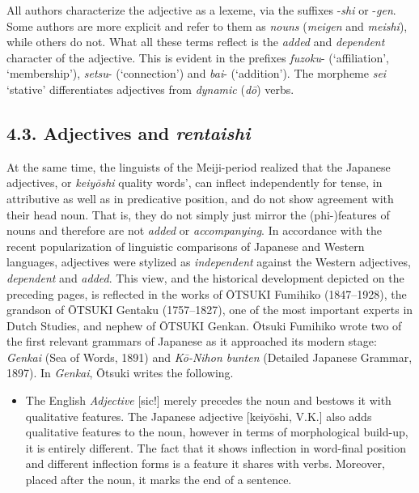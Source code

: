 \documentclass[output=paper]{langscibook}
\begin{document}
All authors characterize the adjective as a lexeme, via the suffixes -\textit{shi} or -\textit{gen}. Some authors are more explicit and refer to them as \textit{nouns} (\textit{meigen} and \textit{meishi}), while others do not. What all these terms reflect is the \textit{added} and \textit{dependent} character of the adjective. This is evident in the prefixes \textit{fuzoku}{}- (‘affiliation’, ‘membership’), \textit{setsu}{}- (‘connection’) and \textit{bai}{}- (‘addition’). The morpheme \textit{sei} ‘stative’ differentiates adjectives from \textit{dynamic} (\textit{dō}) verbs. 

\subsection{4.3. Adjectives and \textit{rentaishi}}

At the same time, the linguists of the Meiji-period realized that the Japanese adjectives, or \textit{keiyōshi} {\textasciigrave}quality words’, can inflect independently for tense, in attributive as well as in predicative position, and do not show agreement with their head noun. That is, they do not simply just mirror the (phi-)features of nouns and therefore are not \textit{added} or \textit{accompanying}. In accordance with the recent popularization of linguistic comparisons of Japanese and Western languages, adjectives were stylized as \textit{independent} against the Western adjectives, \textit{dependent} and \textit{added}. This view, and the historical development depicted on the preceding pages, is reflected in the works of ŌTSUKI Fumihiko (1847–1928), the grandson of ŌTSUKI Gentaku (1757–1827), one of the most important experts in Dutch Studies, and nephew of ŌTSUKI Genkan. Ōtsuki Fumihiko wrote two of the first relevant grammars of Japanese as it approached its modern stage: \textit{Genkai} (Sea of Words, 1891) and \textit{Kō-Nihon bunten} (Detailed Japanese Grammar, 1897). In \textit{Genkai}, Ōtsuki writes the following. 


\begin{itemize}
\item \begin{styleBeispielCinqueKapitel}
The English \textit{Adjective} [sic!] merely precedes the noun and bestows it with qualitative features. The Japanese adjective [keiyōshi, V.K.] also adds qualitative features to the noun, however in terms of morphological build-up, it is entirely different. The fact that it shows inflection in word-final position and different inflection forms is a feature it shares with verbs. Moreover, placed after the noun, it marks the end of a sentence. \citep[28]{Ōtsuki1891}
\end{styleBeispielCinqueKapitel}
\end{itemize}
\end{document}
